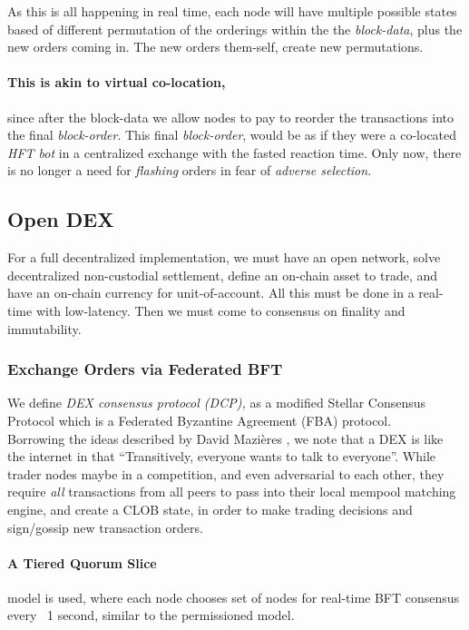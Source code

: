 \documentclass[12pt]{article}
\begin{document}
As this is all happening in real time, each node will have multiple possible states based of different permutation of the orderings within the the \emph{block-data}, plus the new orders coming in. The new orders them-self, create new permutations. 

\paragraph*{This is akin to virtual co-location,} since after the block-data we allow nodes to pay to reorder the transactions into the final \emph{block-order}. This final \emph{block-order}, would be as if they were a co-located \emph{HFT bot} in a centralized exchange with the fasted reaction time. Only now, there is no longer a need for \emph{flashing} orders in fear of \emph{adverse selection}. 

\subsection*{Open DEX}
For a full decentralized implementation, we must have an open network, solve decentralized non-custodial settlement, define an on-chain asset to trade, and have an on-chain currency for unit-of-account. All this must be done in a real-time with low-latency. Then we must come to consensus on finality and immutability. 

\subsubsection*{Exchange Orders via Federated BFT} 
We define \emph{DEX consensus protocol (DCP),} as a modified Stellar Consensus Protocol \cite{thestellar} which is a Federated Byzantine Agreement (FBA) protocol. \\

Borrowing the ideas described by David Mazières \cite{thestellar}, we note that a DEX is like the internet in that ``Transitively, everyone wants to talk to everyone''. While trader nodes maybe in a competition, and even adversarial to each other, they require \emph{all} transactions from all peers to pass into their local mempool matching engine, and create a CLOB state, in order to make trading decisions and sign/gossip new transaction orders.        

\paragraph{A Tiered Quorum Slice} model is used, where each node chooses set of nodes for real-time BFT consensus every ~1 second, similar to the permissioned model. 
\end{document}
